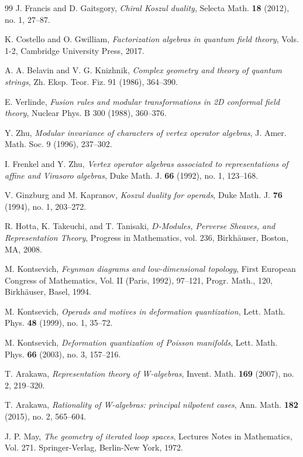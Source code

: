 \begin{thebibliography}{99}
 J. Francis and D. Gaitsgory, \emph{Chiral Koszul duality}, Selecta Math. \textbf{18} (2012), no. 1, 27--87.

 K. Costello and O. Gwilliam, \emph{Factorization algebras in quantum field theory}, Vols. 1-2, Cambridge University Press, 2017.

 A. A. Belavin and V. G. Knizhnik, \emph{Complex geometry and theory of quantum strings}, 
  Zh. Eksp. Teor. Fiz. 91 (1986), 364--390.
  
 E. Verlinde, \emph{Fusion rules and modular transformations in 2D conformal field theory}, 
  Nuclear Phys. B 300 (1988), 360--376.

 Y. Zhu, \emph{Modular invariance of characters of vertex operator algebras},
  J. Amer. Math. Soc. 9 (1996), 237--302.

 I. Frenkel and Y. Zhu, \emph{Vertex operator algebras associated to representations of affine and Virasoro algebras}, Duke Math. J. \textbf{66} (1992), no. 1, 123--168.

 V. Ginzburg and M. Kapranov, \emph{Koszul duality for operads}, Duke Math. J. \textbf{76} (1994), no. 1, 203--272.

 R. Hotta, K. Takeuchi, and T. Tanisaki, \emph{$D$-Modules, Perverse Sheaves, and Representation Theory}, Progress in Mathematics, vol. 236, Birkhäuser, Boston, MA, 2008.

 M. Kontsevich, \emph{Feynman diagrams and low-dimensional topology}, First European Congress of Mathematics, Vol. II (Paris, 1992), 97--121, Progr. Math., 120, Birkhäuser, Basel, 1994.

 M. Kontsevich, \emph{Operads and motives in deformation quantization}, Lett. Math. Phys. \textbf{48} (1999), no. 1, 35--72.

 M. Kontsevich, \emph{Deformation quantization of Poisson manifolds}, Lett. Math. Phys. \textbf{66} (2003), no. 3, 157--216.

 T. Arakawa, \emph{Representation theory of W-algebras}, Invent. Math. \textbf{169} (2007), no. 2, 219--320.

 T. Arakawa, \emph{Rationality of W-algebras: principal nilpotent cases}, Ann. Math. \textbf{182} (2015), no. 2, 565--604.

 J. P. May, \emph{The geometry of iterated loop spaces}, Lectures Notes in Mathematics, Vol. 271. Springer-Verlag, Berlin-New York, 1972.


\end{thebibliography}
